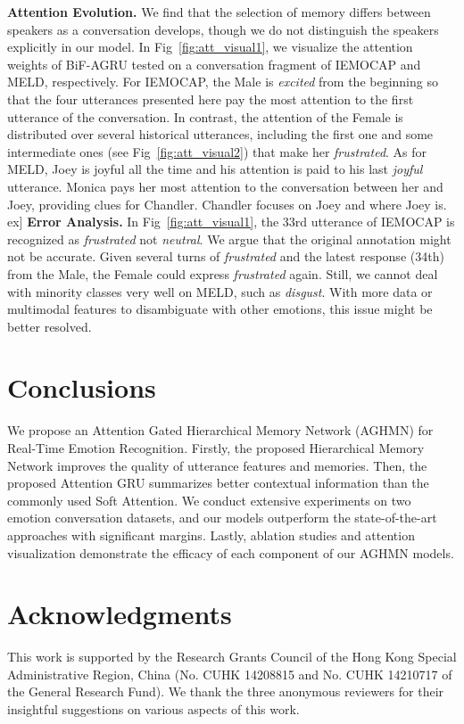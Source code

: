 \documentclass[letterpaper]{article} \usepackage{aaai20}  \usepackage{times}  \usepackage{helvet} \usepackage{courier}  \usepackage[hyphens]{url}  \usepackage{graphicx} \urlstyle{rm} \def\UrlFont{\rm}  \usepackage{graphicx}  \frenchspacing  \setlength{\pdfpagewidth}{8.5in}  \setlength{\pdfpageheight}{11in}
\begin{document}
\noindent\textbf{Attention Evolution.}
We find that the selection of memory differs between speakers as a conversation develops, though we do not distinguish the speakers explicitly in our model. In Fig~\ref{fig:att_visual1}, we visualize the attention weights of BiF-AGRU tested on a conversation fragment of IEMOCAP and MELD, respectively. For IEMOCAP, the Male is \textit{excited} from the beginning so that the four utterances presented here pay the most attention to the first utterance of the conversation. In contrast, the attention of the Female is distributed over several historical utterances, including the first one and some intermediate ones (see Fig~\ref{fig:att_visual2}) that make her \textit{frustrated}. As for MELD, Joey is joyful all the time and his attention is paid to his last \textit{joyful} utterance. Monica pays her most attention to the conversation between her and Joey, providing clues for Chandler. Chandler focuses on Joey and where Joey is.
\1ex]
\noindent\textbf{Error Analysis.}
In Fig~\ref{fig:att_visual1}, the 33rd utterance of IEMOCAP is recognized as \textit{frustrated} not \textit{neutral}. We argue that the original annotation might not be accurate. Given several turns of \textit{frustrated} and the latest response (34th) from the Male, the Female could express \textit{frustrated} again. Still, we cannot deal with minority classes very well on MELD, such as \textit{disgust}. With more data or multimodal features to disambiguate with other emotions, this issue might be better resolved.


\section{Conclusions}

We propose an Attention Gated Hierarchical Memory Network (AGHMN) for Real-Time Emotion Recognition. Firstly, the proposed Hierarchical Memory Network improves the quality of utterance features and memories. Then, the proposed Attention GRU summarizes better contextual information than the commonly used Soft Attention. We conduct extensive experiments on two emotion conversation datasets, and our models outperform the state-of-the-art approaches with significant margins. Lastly, ablation studies and attention visualization demonstrate the efficacy of each component of our AGHMN models.


\section{ Acknowledgments}
This work is supported by the Research Grants
Council of the Hong Kong Special Administrative Region, China (No. CUHK 14208815 and
No. CUHK 14210717 of the General Research
Fund). We thank the three anonymous
reviewers for their insightful suggestions on various
aspects of this work.



\end{document}
